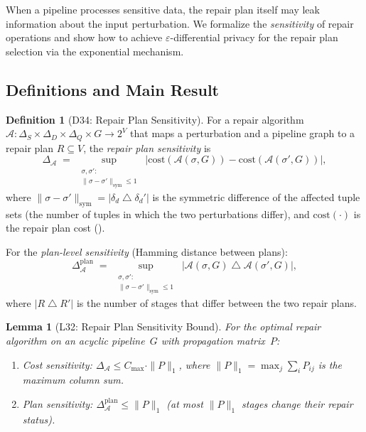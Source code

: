 \documentclass[11pt,a4paper]{article}
\newtheorem{lemma}[theorem]{Lemma}
\theoremstyle{definition}
\newtheorem{definition}[theorem]{Definition}
\newcommand{\DeltaS}{\Delta_{\!S}}
\newcommand{\DeltaD}{\Delta_{\!D}}
\newcommand{\DeltaQ}{\Delta_{\!Q}}
\newcommand{\cost}{\mathrm{cost}}
\begin{document}
When a pipeline processes sensitive data, the repair plan itself may leak
information about the input perturbation.  We formalize the \emph{sensitivity}
of repair operations and show how to achieve $\varepsilon$-differential privacy
for the repair plan selection via the exponential mechanism.

\subsection{Definitions and Main Result}

\begin{definition}[D34: Repair Plan Sensitivity]\label{def:repair-sensitivity}
For a repair algorithm $\mathcal{A}\colon \DeltaS \times \DeltaD \times
\DeltaQ \times G \to 2^V$ that maps a perturbation and a pipeline graph
to a repair plan $R \subseteq V$, the \emph{repair plan sensitivity} is
\[
  \Delta_{\mathcal{A}}
  \;=\; \sup_{\substack{\sigma, \sigma' :\\
    \|\sigma - \sigma'\|_{\mathrm{sym}} \leq 1}}
  \;\bigl|\cost(\mathcal{A}(\sigma, G)) - \cost(\mathcal{A}(\sigma', G))\bigr|,
\]
where $\|\sigma - \sigma'\|_{\mathrm{sym}} = |\delta_d \mathbin{\triangle}
\delta_d'|$ is the symmetric difference of the affected tuple sets
(the number of tuples in which the two perturbations differ), and
$\cost(\cdot)$ is the repair plan cost ().

For the \emph{plan-level sensitivity} (Hamming distance between plans):
\[
  \Delta^{\mathrm{plan}}_{\mathcal{A}}
  \;=\; \sup_{\substack{\sigma, \sigma' :\\
    \|\sigma - \sigma'\|_{\mathrm{sym}} \leq 1}}
  \;|\mathcal{A}(\sigma, G) \mathbin{\triangle}
    \mathcal{A}(\sigma', G)|,
\]
where $|R \mathbin{\triangle} R'|$ is the number of stages that differ
between the two repair plans.
\end{definition}

\begin{lemma}[L32: Repair Plan Sensitivity Bound]\label{lem:repair-sensitivity}
For the optimal repair algorithm on an acyclic pipeline~$G$ with propagation
matrix~$P$:
\begin{enumerate}[label=(\alph*)]
  \item \emph{Cost sensitivity:}
    $\Delta_{\mathcal{A}} \leq C_{\max} \cdot \|P\|_1$,
    where $\|P\|_1 = \max_j \sum_i P_{ij}$ is the maximum column sum.
  \item \emph{Plan sensitivity:}
    $\Delta^{\mathrm{plan}}_{\mathcal{A}} \leq \|P\|_1$
    (at most $\|P\|_1$ stages change their repair status).
\end{enumerate}
\end{lemma}
\end{document}
